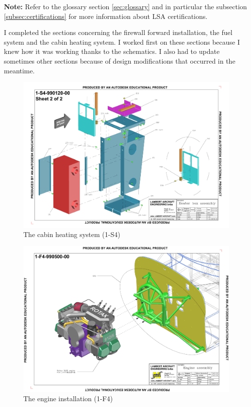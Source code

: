 \documentclass[11pt,a4paper]{article}
\begin{document}
\textbf{Note:} Refer to the glossary section \ref{sec:glossary} and in particular the subsection \ref{subsec:certifications} for more information about LSA certifications.


\newpage

I completed the sections concerning the firewall forward installation, the fuel system and the cabin heating system. I worked first on these sections because I knew how it was working thanks to the schematics. I also had to update sometimes other sections because of design modifications that occurred in the meantime.

\begin{figure}[ht!]
	\begin{center}
		\includegraphics[width=13cm,trim = 1.5cm 1cm 1.5cm 1cm, clip]{pics/PIC013.pdf}
		\caption{The cabin heating system (1-S4)}
		\label{fig:PIC013}
	\end{center}
\end{figure}

\begin{figure}[ht!]
	\begin{center}
		\includegraphics[width=13cm,trim = 1.5cm 0.5cm 1cm 1cm, clip]{pics/PIC014.pdf}
		\caption{The engine installation (1-F4)}
		\label{fig:PIC014}
	\end{center}
\end{figure}
\end{document}

